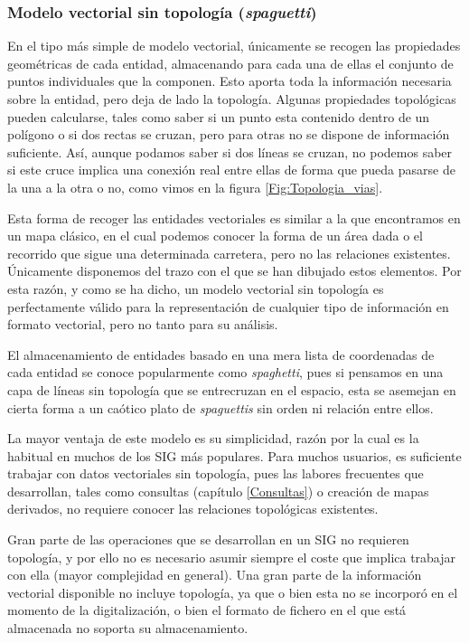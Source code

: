 \begin{multicols}{2}

\subsubsection{Modelo vectorial sin topología (\emph{spaguetti})}




En el tipo más simple de modelo vectorial, únicamente se recogen las propiedades geométricas de cada entidad, almacenando para cada una de ellas el conjunto de puntos individuales que la componen. Esto aporta toda la información necesaria sobre la entidad, pero deja de lado la topología. Algunas propiedades topológicas pueden calcularse, tales como saber si un punto esta contenido dentro de un polígono o si dos rectas se cruzan, pero para otras no se dispone de información suficiente. Así, aunque podamos saber si dos líneas se cruzan, no podemos saber si este cruce implica una conexión real entre ellas de forma que pueda pasarse de la una a la otra o no, como vimos en la figura \ref{Fig:Topologia_vias}.

Esta forma de recoger las entidades vectoriales es similar a la que encontramos en un mapa clásico, en el cual podemos conocer la forma de un área dada o el recorrido que sigue una determinada carretera, pero no las relaciones existentes. Únicamente disponemos del trazo con el que se han dibujado estos elementos. Por esta razón, y como se ha dicho, un modelo vectorial sin topología es perfectamente válido para la representación de cualquier tipo de información en formato vectorial, pero no tanto para su análisis.

El almacenamiento de entidades basado en una mera lista de coordenadas de cada entidad se conoce popularmente como \emph{spaghetti}, pues si pensamos en una capa de líneas sin topología que se entrecruzan en el espacio, esta se asemejan en cierta forma a un caótico plato de \emph{spaguettis} sin orden ni relación entre ellos.

La mayor ventaja de este modelo es su simplicidad, razón por la cual es la habitual en muchos de los SIG más populares. Para muchos usuarios, es suficiente trabajar con datos vectoriales sin topología, pues las labores frecuentes que desarrollan, tales como consultas (capítulo \ref{Consultas}) o creación de mapas derivados, no requiere conocer las relaciones topológicas existentes.

Gran parte de las operaciones que se desarrollan en un SIG no requieren topología, y por ello no es necesario asumir siempre el coste que implica trabajar con ella (mayor complejidad en general). Una gran parte de la información vectorial disponible no incluye topología, ya que o bien esta no se incorporó en el momento de la digitalización, o bien el formato de fichero en el que está almacenada no soporta su almacenamiento. 


\end{multicols}

